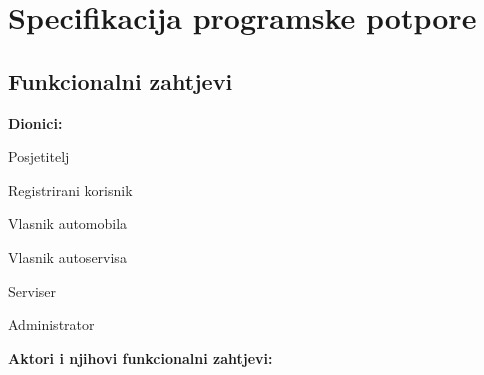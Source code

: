 \chapter{Specifikacija programske potpore}
		
	\section{Funkcionalni zahtjevi}
				
			\noindent \textbf{Dionici:}
			
			\begin{packed_enum}
				
				\item Posjetitelj
				\item Registrirani korisnik
				\item Vlasnik automobila			
				\item Vlasnik autoservisa
				\item Serviser
				\item Administrator
				
			\end{packed_enum}
			
			\noindent \textbf{Aktori i njihovi funkcionalni zahtjevi:}
			

